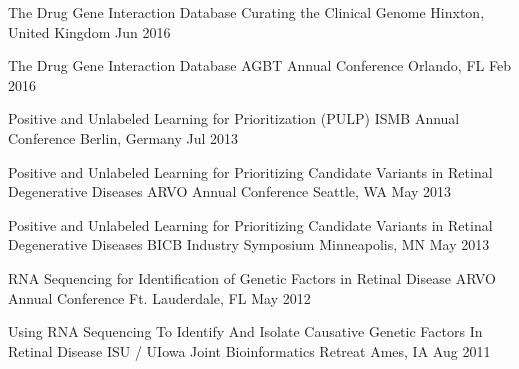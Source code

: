 \poster
{The Drug Gene Interaction Database}
{Curating the Clinical Genome}
{Hinxton, United Kingdom}
{Jun 2016}

\poster
{The Drug Gene Interaction Database}
{AGBT Annual Conference}
{Orlando, FL}
{Feb 2016}

\poster
{Positive and Unlabeled Learning for Prioritization (PULP)}
{ISMB Annual Conference}
{Berlin, Germany}
{Jul 2013}

\poster
{Positive and Unlabeled Learning for Prioritizing Candidate Variants in Retinal Degenerative Diseases}
{ARVO Annual Conference}
{Seattle, WA}
{May 2013}

\poster
{Positive and Unlabeled Learning for Prioritizing Candidate Variants in Retinal Degenerative Diseases}
{BICB Industry Symposium}
{Minneapolis, MN}
{May 2013}

\poster
{RNA Sequencing for Identification of Genetic Factors in Retinal Disease}
{ARVO Annual Conference}
{Ft. Lauderdale, FL}
{May 2012}

\poster
{Using RNA Sequencing To Identify And Isolate Causative Genetic Factors In Retinal Disease}
{ISU / UIowa Joint Bioinformatics Retreat}
{Ames, IA}
{Aug 2011}





